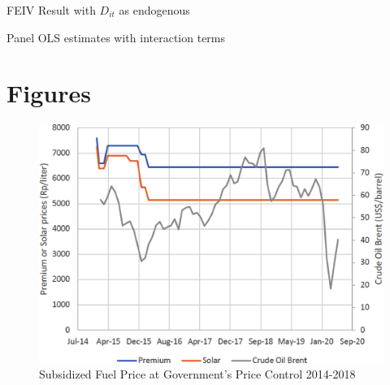 \documentclass[letterpaper,12pt,leqno]{article}
\begin{document}
\begin{landscape}
\begin{table}[h]
\caption{FEIV Result with $D_{it}$ as endogenous \hyperlink{FEIVclick}{}}
\scalebox{0.8}{}    
\label{t:FEIV2}\end{table}


\begin{table}[h]
\caption{Panel OLS estimates with interaction terms} 
\scalebox{0.85}{}
\label{t:pols2}\end{table}

\end{landscape}

\section{Figures}

\begin{figure}[h]
\includegraphics[scale=0.7]{Final_Project/image/bbm-price-2014-2018.jpg}
\caption{Subsidized Fuel Price at Government's Price Control 2014-2018}
\label{f:1}
\end{figure}
\end{document}
